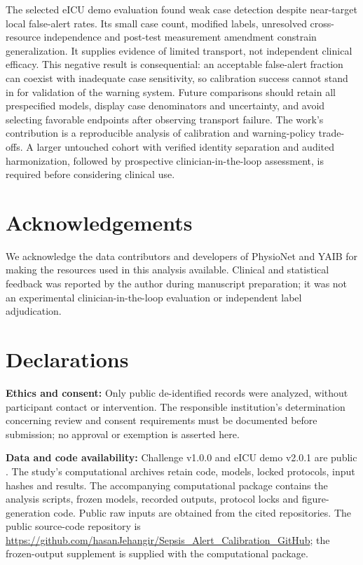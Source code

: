 \documentclass[preprint,12pt]{elsarticle}
\begin{document}
The selected eICU demo evaluation found weak case detection despite near-target local false-alert rates. Its small case count, modified labels, unresolved cross-resource independence and post-test measurement amendment constrain generalization. It supplies evidence of limited transport, not independent clinical efficacy. This negative result is consequential: an acceptable false-alert fraction can coexist with inadequate case sensitivity, so calibration success cannot stand in for validation of the warning system. Future comparisons should retain all prespecified models, display case denominators and uncertainty, and avoid selecting favorable endpoints after observing transport failure. The work's contribution is a reproducible analysis of calibration and warning-policy trade-offs. A larger untouched cohort with verified identity separation and audited harmonization, followed by prospective clinician-in-the-loop assessment, is required before considering clinical use.

\FloatBarrier
\section*{Acknowledgements}
We acknowledge the data contributors and developers of PhysioNet and YAIB for making the resources used in this analysis available. Clinical and statistical feedback was reported by the author during manuscript preparation; it was not an experimental clinician-in-the-loop evaluation or independent label adjudication.

\section*{Declarations}
\textbf{Ethics and consent:} Only public de-identified records were analyzed, without participant contact or intervention. The responsible institution's determination concerning review and consent requirements must be documented before submission; no approval or exemption is asserted here.

\textbf{Data and code availability:} Challenge v1.0.0 and eICU demo v2.0.1 are public \cite{reynadata,eicudemo}. The study's computational archives retain code, models, locked protocols, input hashes and results. The accompanying computational package contains the analysis scripts, frozen models, recorded outputs, protocol locks and figure-generation code. Public raw inputs are obtained from the cited repositories. The public source-code repository is \url{https://github.com/hasanJehangir/Sepsis_Alert_Calibration_GitHub}; the frozen-output supplement is supplied with the computational package.
\end{document}
